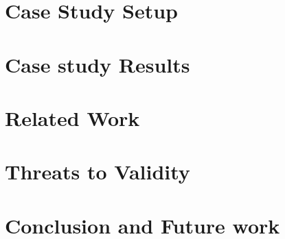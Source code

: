 \documentclass[10pt, conference]{IEEEtran}
\begin{document}
\section{Case Study Setup}
\label{sec:approach}


\section{Case study Results}
\label{sec:case_study_results}


%

\section{Related Work}
\label{sec:related_work}



\section{Threats to Validity}
\label{sec:threats_to_validity}


\section{Conclusion and Future work}
\label{sec:conclusion}



\balance
  
\end{document}
